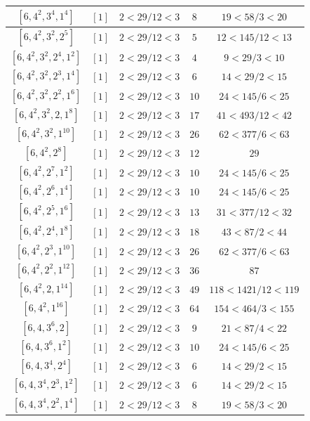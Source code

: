 \documentclass{article}%
\begin{document}
\begin{center}
\begin{longtable}{||c|c|c|c|c||}
$[6, 4^{2}, 3^{4}, 1^{4}]$ & $[1]$ & $2 < 29/12 < 3$ & $8$ & $19 < 58/3 < 20$ \\ \hline 
$[6, 4^{2}, 3^{2}, 2^{5}]$ & $[1]$ & $2 < 29/12 < 3$ & $5$ & $12 < 145/12 < 13$ \\ \hline 
$[6, 4^{2}, 3^{2}, 2^{4}, 1^{2}]$ & $[1]$ & $2 < 29/12 < 3$ & $4$ & $9 < 29/3 < 10$ \\ \hline 
$[6, 4^{2}, 3^{2}, 2^{3}, 1^{4}]$ & $[1]$ & $2 < 29/12 < 3$ & $6$ & $14 < 29/2 < 15$ \\ \hline 
$[6, 4^{2}, 3^{2}, 2^{2}, 1^{6}]$ & $[1]$ & $2 < 29/12 < 3$ & $10$ & $24 < 145/6 < 25$ \\ \hline 
$[6, 4^{2}, 3^{2}, 2, 1^{8}]$ & $[1]$ & $2 < 29/12 < 3$ & $17$ & $41 < 493/12 < 42$ \\ \hline 
$[6, 4^{2}, 3^{2}, 1^{10}]$ & $[1]$ & $2 < 29/12 < 3$ & $26$ & $62 < 377/6 < 63$ \\ \hline 
$[6, 4^{2}, 2^{8}]$ & $[1]$ & $2 < 29/12 < 3$ & $12$ & $29$ \\ \hline 
$[6, 4^{2}, 2^{7}, 1^{2}]$ & $[1]$ & $2 < 29/12 < 3$ & $10$ & $24 < 145/6 < 25$ \\ \hline 
$[6, 4^{2}, 2^{6}, 1^{4}]$ & $[1]$ & $2 < 29/12 < 3$ & $10$ & $24 < 145/6 < 25$ \\ \hline 
$[6, 4^{2}, 2^{5}, 1^{6}]$ & $[1]$ & $2 < 29/12 < 3$ & $13$ & $31 < 377/12 < 32$ \\ \hline 
$[6, 4^{2}, 2^{4}, 1^{8}]$ & $[1]$ & $2 < 29/12 < 3$ & $18$ & $43 < 87/2 < 44$ \\ \hline 
$[6, 4^{2}, 2^{3}, 1^{10}]$ & $[1]$ & $2 < 29/12 < 3$ & $26$ & $62 < 377/6 < 63$ \\ \hline 
$[6, 4^{2}, 2^{2}, 1^{12}]$ & $[1]$ & $2 < 29/12 < 3$ & $36$ & $87$ \\ \hline 
$[6, 4^{2}, 2, 1^{14}]$ & $[1]$ & $2 < 29/12 < 3$ & $49$ & $118 < 1421/12 < 119$ \\ \hline 
$[6, 4^{2}, 1^{16}]$ & $[1]$ & $2 < 29/12 < 3$ & $64$ & $154 < 464/3 < 155$ \\ \hline 
$[6, 4, 3^{6}, 2]$ & $[1]$ & $2 < 29/12 < 3$ & $9$ & $21 < 87/4 < 22$ \\ \hline 
$[6, 4, 3^{6}, 1^{2}]$ & $[1]$ & $2 < 29/12 < 3$ & $10$ & $24 < 145/6 < 25$ \\ \hline 
$[6, 4, 3^{4}, 2^{4}]$ & $[1]$ & $2 < 29/12 < 3$ & $6$ & $14 < 29/2 < 15$ \\ \hline 
$[6, 4, 3^{4}, 2^{3}, 1^{2}]$ & $[1]$ & $2 < 29/12 < 3$ & $6$ & $14 < 29/2 < 15$ \\ \hline 
$[6, 4, 3^{4}, 2^{2}, 1^{4}]$ & $[1]$ & $2 < 29/12 < 3$ & $8$ & $19 < 58/3 < 20$ \\ \hline 

\end{longtable}
\end{center}
\end{document}
